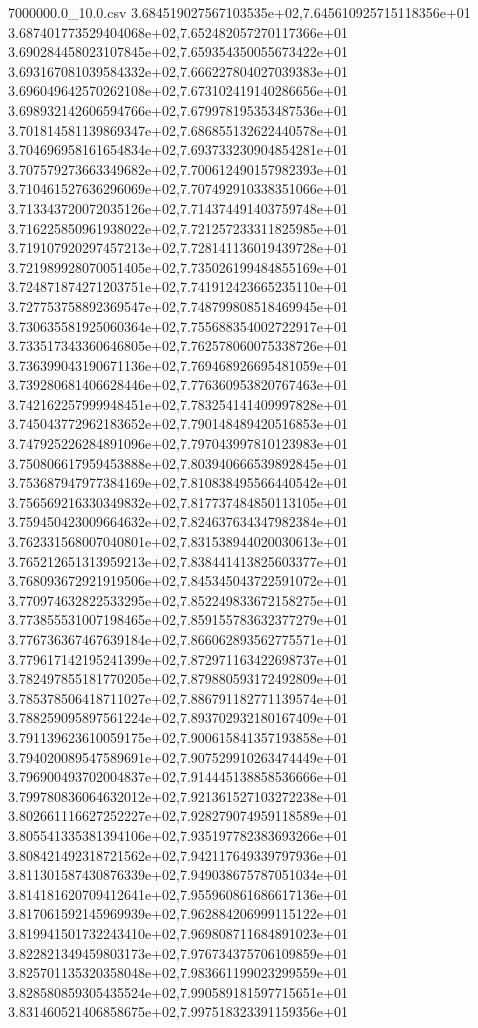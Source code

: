\begin{filecontents*}{7000000.0_10.0.csv}
3.684519027567103535e+02,7.645610925715118356e+01
3.687401773529404068e+02,7.652482057270117366e+01
3.690284458023107845e+02,7.659354350055673422e+01
3.693167081039584332e+02,7.666227804027039383e+01
3.696049642570262108e+02,7.673102419140286656e+01
3.698932142606594766e+02,7.679978195353487536e+01
3.701814581139869347e+02,7.686855132622440578e+01
3.704696958161654834e+02,7.693733230904854281e+01
3.707579273663349682e+02,7.700612490157982393e+01
3.710461527636296069e+02,7.707492910338351066e+01
3.713343720072035126e+02,7.714374491403759748e+01
3.716225850961938022e+02,7.721257233311825985e+01
3.719107920297457213e+02,7.728141136019439728e+01
3.721989928070051405e+02,7.735026199484855169e+01
3.724871874271203751e+02,7.741912423665235110e+01
3.727753758892369547e+02,7.748799808518469945e+01
3.730635581925060364e+02,7.755688354002722917e+01
3.733517343360646805e+02,7.762578060075338726e+01
3.736399043190671136e+02,7.769468926695481059e+01
3.739280681406628446e+02,7.776360953820767463e+01
3.742162257999948451e+02,7.783254141409997828e+01
3.745043772962183652e+02,7.790148489420516853e+01
3.747925226284891096e+02,7.797043997810123983e+01
3.750806617959453888e+02,7.803940666539892845e+01
3.753687947977384169e+02,7.810838495566440542e+01
3.756569216330349832e+02,7.817737484850113105e+01
3.759450423009664632e+02,7.824637634347982384e+01
3.762331568007040801e+02,7.831538944020030613e+01
3.765212651313959213e+02,7.838441413825603377e+01
3.768093672921919506e+02,7.845345043722591072e+01
3.770974632822533295e+02,7.852249833672158275e+01
3.773855531007198465e+02,7.859155783632377279e+01
3.776736367467639184e+02,7.866062893562775571e+01
3.779617142195241399e+02,7.872971163422698737e+01
3.782497855181770205e+02,7.879880593172492809e+01
3.785378506418711027e+02,7.886791182771139574e+01
3.788259095897561224e+02,7.893702932180167409e+01
3.791139623610059175e+02,7.900615841357193858e+01
3.794020089547589691e+02,7.907529910263474449e+01
3.796900493702004837e+02,7.914445138858536666e+01
3.799780836064632012e+02,7.921361527103272238e+01
3.802661116627252227e+02,7.928279074959118589e+01
3.805541335381394106e+02,7.935197782383693266e+01
3.808421492318721562e+02,7.942117649339797936e+01
3.811301587430876339e+02,7.949038675787051034e+01
3.814181620709412641e+02,7.955960861686617136e+01
3.817061592145969939e+02,7.962884206999115122e+01
3.819941501732243410e+02,7.969808711684891023e+01
3.822821349459803173e+02,7.976734375706109859e+01
3.825701135320358048e+02,7.983661199023299559e+01
3.828580859305435524e+02,7.990589181597715651e+01
3.831460521406858675e+02,7.997518323391159356e+01

\end{filecontents*}
